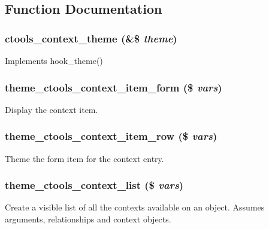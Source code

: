 \subsection{Function Documentation}
\hypertarget{context_8theme_8inc_aee55c917e7b5c7aa1b692648e3e3afeb}{
\subsubsection[{ctools\_\-context\_\-theme}]{\setlength{\rightskip}{0pt plus 5cm}ctools\_\-context\_\-theme (\&\$ {\em theme})}}
\label{context_8theme_8inc_aee55c917e7b5c7aa1b692648e3e3afeb}
Implements hook\_\-theme() \hypertarget{context_8theme_8inc_a398190b6916d7cd66e63a9f5e8ce1692}{
\subsubsection[{theme\_\-ctools\_\-context\_\-item\_\-form}]{\setlength{\rightskip}{0pt plus 5cm}theme\_\-ctools\_\-context\_\-item\_\-form (\$ {\em vars})}}
\label{context_8theme_8inc_a398190b6916d7cd66e63a9f5e8ce1692}
Display the context item. \hypertarget{context_8theme_8inc_a235f6b6bdf1635a0e13580793e5aedf4}{
\subsubsection[{theme\_\-ctools\_\-context\_\-item\_\-row}]{\setlength{\rightskip}{0pt plus 5cm}theme\_\-ctools\_\-context\_\-item\_\-row (\$ {\em vars})}}
\label{context_8theme_8inc_a235f6b6bdf1635a0e13580793e5aedf4}
Theme the form item for the context entry. \hypertarget{context_8theme_8inc_ac1c4694176a4b8f87275932cfd677cb1}{
\subsubsection[{theme\_\-ctools\_\-context\_\-list}]{\setlength{\rightskip}{0pt plus 5cm}theme\_\-ctools\_\-context\_\-list (\$ {\em vars})}}
\label{context_8theme_8inc_ac1c4694176a4b8f87275932cfd677cb1}
Create a visible list of all the contexts available on an object. Assumes arguments, relationships and context objects.

